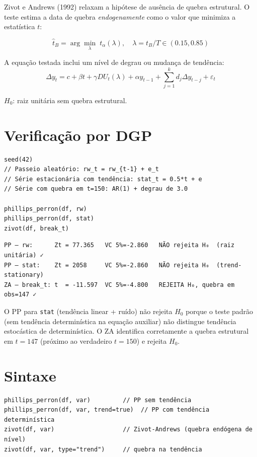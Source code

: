 Zivot e Andrews (1992) relaxam a hipótese de ausência de quebra estrutural.
O teste estima a data de quebra \emph{endogenamente} como o valor que minimiza
a estatística $t$:

\[
  \hat{t}_B = \arg\min_\lambda \; t_\alpha(\lambda), \quad \lambda = t_B/T \in (0.15, 0.85)
\]

A equação testada inclui um nível de degrau ou mudança de tendência:
\[
  \Delta y_t = c + \beta t + \gamma D U_t(\lambda) + \alpha y_{t-1} + \sum_{j=1}^k d_j \Delta y_{t-j} + \varepsilon_t
\]

$H_0$: raiz unitária sem quebra estrutural.

\section{Verificação por DGP}

\begin{lstlisting}[caption={PP e Zivot-Andrews}]
seed(42)
// Passeio aleatório: rw_t = rw_{t-1} + e_t
// Série estacionária com tendência: stat_t = 0.5*t + e
// Série com quebra em t=150: AR(1) + degrau de 3.0

phillips_perron(df, rw)
phillips_perron(df, stat)
zivot(df, break_t)
\end{lstlisting}

\begin{lstlisting}[language={}, basicstyle=\ttfamily\small, frame=none,
  numbers=none, backgroundcolor=\color{codbg}]
PP — rw:      Zt = 77.365   VC 5%=-2.860   NÃO rejeita H₀  (raiz unitária) ✓
PP — stat:    Zt = 2058     VC 5%=-2.860   NÃO rejeita H₀  (trend-stationary)
ZA — break_t: t  = -11.597  VC 5%=-4.800   REJEITA H₀, quebra em obs=147 ✓
\end{lstlisting}

O PP para \texttt{stat} (tendência linear + ruído) não rejeita $H_0$ porque o
teste padrão (sem tendência determinística na equação auxiliar) não distingue
tendência estocástica de determinística. O ZA identifica corretamente a quebra
estrutural em $t=147$ (próximo ao verdadeiro $t=150$) e rejeita $H_0$.

\section{Sintaxe}

\begin{lstlisting}
phillips_perron(df, var)         // PP sem tendência
phillips_perron(df, var, trend=true)  // PP com tendência determinística
zivot(df, var)                   // Zivot-Andrews (quebra endógena de nível)
zivot(df, var, type="trend")     // quebra na tendência
\end{lstlisting}

